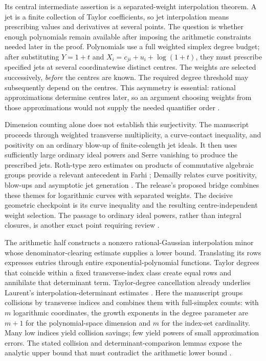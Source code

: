 Its central intermediate assertion is a separated-weight interpolation
theorem. A jet is a finite collection of Taylor coefficients, so jet
interpolation means prescribing values and derivatives at several
points. The question is whether enough polynomials remain available
after imposing the arithmetic constraints needed later in the proof.
Polynomials use a full weighted simplex degree budget; after
substituting $Y=1+t$ and $X_i=c_{ji}+u_i+\log(1+t)$, they must prescribe
specified jets at several coordinatewise distinct centres. The weights are
selected successively, \emph{before} the centres are known. The required
degree threshold may subsequently depend on the centres. This asymmetry is
essential: rational approximations determine centres later, so an argument
choosing weights from those approximations would not supply the needed
quantifier order \cite{arithOpenAI017}.

Dimension counting alone does not establish this surjectivity. The
manuscript proceeds through weighted transverse multiplicity, a curve-contact
inequality, and positivity on an ordinary blow-up of finite-colength jet
ideals. It then uses sufficiently large ordinary ideal powers and Serre
vanishing to produce the prescribed jets. Roth-type zero estimates on
products of commutative algebraic groups provide a relevant antecedent in
Farhi \cite{arithFarhi2006}; Demailly relates curve positivity, blow-ups and
asymptotic jet generation \cite{arithDemailly1992}. The release's proposed
bridge combines these themes for logarithmic curves with separated weights.
The decisive geometric checkpoint is its curve inequality and the resulting
centre-independent weight selection. The passage to ordinary ideal powers,
rather than integral closures, is another exact point requiring review
\cite{arithOpenAI017}.

The arithmetic half constructs a nonzero rational-Gaussian interpolation
minor whose denominator-clearing estimate supplies a lower bound. Translating
its rows expresses entries through entire exponential-polynomial functions.
Taylor degrees that coincide within a fixed transverse-index class create
equal rows and annihilate that determinant term. Taylor-degree cancellation
already underlies Laurent's interpolation-determinant estimates
\cite{arithLaurent2000}. Here the manuscript groups collisions by transverse
indices and combines them with full-simplex counts: with $m$ logarithmic
coordinates, the growth exponents in the degree parameter are $m+1$ for
the polynomial-space dimension and $m$ for the index-set cardinality.
Many low indices yield collision savings; few yield powers of small
approximation errors. The stated collision and determinant-comparison
lemmas expose the analytic upper bound that must contradict the arithmetic
lower bound \cite{arithOpenAI017}.

